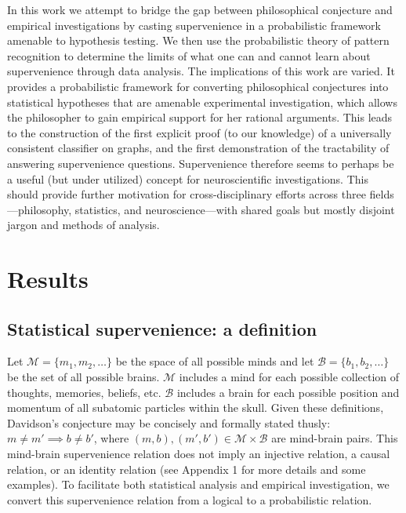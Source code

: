 \documentclass{article}
\providecommand{\mc}[1]{\mathcal{#1}}
\begin{document}
In this work we attempt to bridge the gap between philosophical conjecture and empirical investigations by casting supervenience in a probabilistic framework amenable to hypothesis testing. 
We then use the probabilistic theory of pattern recognition to determine
the limits of what one can and cannot learn about supervenience through data analysis.  
The implications of this work are varied.  It provides a probabilistic framework for converting philosophical conjectures into statistical hypotheses that are amenable experimental investigation, which  allows the philosopher to gain empirical support for her rational arguments. This leads to the construction of the first explicit proof (to our knowledge) of a universally consistent classifier on graphs, and the first demonstration of the tractability of answering supervenience questions.  Supervenience therefore seems to perhaps be a useful (but under utilized) concept for neuroscientific investigations.  This should provide further motivation for cross-disciplinary efforts across three fields---philosophy, statistics, and neuroscience---with shared goals but mostly disjoint jargon and methods of analysis.









\section*{Results}

\subsection*{Statistical supervenience: a definition} %

\noindent Let $\mc{M}=\{m_1, m_2, \ldots\}$ be the space of all possible minds and
let $\mc{B}=\{b_1,b_2,\ldots\}$ be the set of all possible brains.  $\mc{M}$ includes a mind for each possible collection of thoughts, memories, beliefs, etc.
$\mc{B}$ includes a brain for each possible position and momentum of all subatomic particles within the skull.  
Given these definitions, Davidson's conjecture may be concisely and formally stated thusly:  $m \neq m' \implies b \neq b'$, where $(m,b), (m',b') \in \mc{M} \times \mc{B}$ are mind-brain pairs.  This mind-brain supervenience relation does not imply an injective relation, a causal relation, or an identity relation (see Appendix 1 for more details and some examples).  To facilitate both statistical analysis and empirical investigation, we convert this supervenience relation from a logical to a probabilistic relation.  
\end{document}
